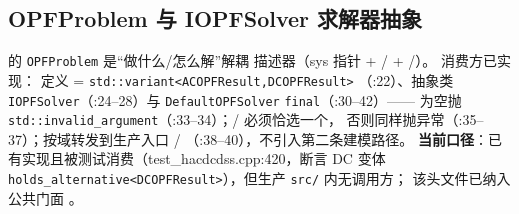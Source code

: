 \subsection{OPFProblem 与 IOPFSolver 求解器抽象}
 的 \texttt{OPFProblem} 是``做什么/怎么解''解耦
描述器（sys 指针 + / + /）。
消费方已实现： 定义
 = \texttt{std::variant<\allowbreak ACOPFResult,\allowbreak DCOPFResult>}
（:22）、抽象类 \texttt{IOPFSolver}（:24--28）与
\texttt{DefaultOPFSolver} \texttt{final}（:30--42）—— 为空抛
\texttt{std::invalid\_argument}（:33--34）；/ 必须恰选一个，
否则同样抛异常（:35--37）；按域转发到生产入口 /
（:38--40），不引入第二条建模路径。
\textbf{当前口径}：已有实现且被测试消费（test\_hacdcdss.cpp:420，断言 DC 变体
\texttt{holds\_alternative<DCOPFResult>}），但生产 \texttt{src/} 内无调用方；
该头文件已纳入公共门面 。

